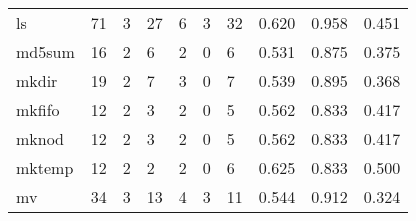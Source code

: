 \begin{longtable}{lp{2.0cm}p{2.0cm}p{2.0cm}p{2.0cm}p{2.0cm}p{2.0cm}p{2.0cm}p{2.0cm}p{2.0cm}}
ls        &                     71 &                                             3 &                                           27 &                                           6 &                                            3 &                                         32 &                                0.620 &                                  0.958 &                                0.451 \\
md5sum    &                     16 &                                             2 &                                            6 &                                           2 &                                            0 &                                          6 &                                0.531 &                                  0.875 &                                0.375 \\
mkdir     &                     19 &                                             2 &                                            7 &                                           3 &                                            0 &                                          7 &                                0.539 &                                  0.895 &                                0.368 \\
mkfifo    &                     12 &                                             2 &                                            3 &                                           2 &                                            0 &                                          5 &                                0.562 &                                  0.833 &                                0.417 \\
mknod     &                     12 &                                             2 &                                            3 &                                           2 &                                            0 &                                          5 &                                0.562 &                                  0.833 &                                0.417 \\
mktemp    &                     12 &                                             2 &                                            2 &                                           2 &                                            0 &                                          6 &                                0.625 &                                  0.833 &                                0.500 \\
mv        &                     34 &                                             3 &                                           13 &                                           4 &                                            3 &                                         11 &                                0.544 &                                  0.912 &                                0.324 \\

\end{longtable}

